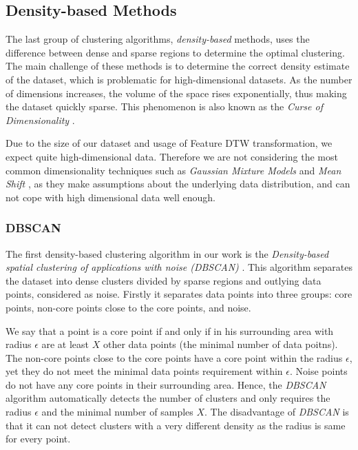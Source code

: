 \subsection{Density-based Methods}
The last group of clustering algorithms, \textit{density-based} methods, uses the difference between dense and sparse regions to determine the optimal clustering. 
The main challenge of these methods is to determine the correct density estimate of the dataset, which is problematic for high-dimensional datasets. As the number of dimensions increases, the volume of the space rises exponentially, thus making the dataset quickly sparse. This phenomenon is also known as the \textit{Curse of Dimensionality} \cite{exp:curse-of-dim}.

Due to the size of our dataset and usage of Feature DTW transformation, we expect quite high-dimensional data. Therefore we are not considering the most common dimensionality techniques such as \textit{Gaussian Mixture Models} \cite{vis:gauss-mixt} and \textit{Mean Shift} \cite{vis:mean-shift}, as they make assumptions about the underlying data distribution, and can not cope with high dimensional data well enough.

\subsubsection{DBSCAN}
The first density-based clustering algorithm in our work is the \textit{Density-based spatial clustering of applications with noise (DBSCAN)} \cite{vis:dbscan}. This algorithm separates the dataset into dense clusters divided by sparse regions and outlying data points, considered as noise. Firstly it separates data points into three groups: core points, non-core points close to the core points, and noise.

We say that a point is a core point if and only if in his surrounding area with radius $\epsilon$ are at least $X$ other data points (the minimal number of data poitns). The non-core points close to the core points have a core point within the radius $\epsilon$, yet they do not meet the minimal data points requirement within $\epsilon$. Noise points do not have any core points in their surrounding area. Hence, the \textit{DBSCAN} algorithm automatically detects the number of clusters and only requires the radius $\epsilon$ and the minimal number of samples $X$. The disadvantage of \textit{DBSCAN} is that it can not detect clusters with a very different density as the radius is same for every point.


